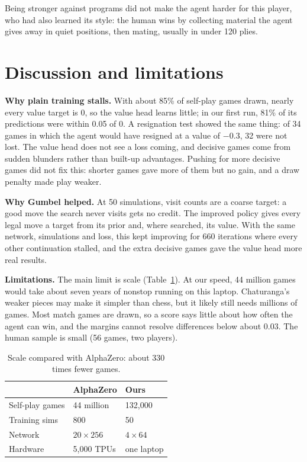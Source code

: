 \documentclass[11pt,a4paper,twocolumn]{article}
\begin{document}
\noindent Being stronger against programs did not make the agent harder for this player,
who had also learned its style: the human wins by collecting material the agent gives away
in quiet positions, then mating, usually in under 120 plies.

\section{Discussion and limitations}
\textbf{Why plain training stalls.} With about 85\% of self-play games drawn, nearly every
value target is 0, so the value head learns little; in our first run, 81\% of its
predictions were within 0.05 of 0. A resignation test showed the same thing: of 34 games
in which the agent would have resigned at a value of $-0.3$, 32 were not lost. The value
head does not see a loss coming, and decisive games come from sudden blunders rather than
built-up advantages. Pushing for more decisive games did not fix this: shorter games
gave more of them but no gain, and a draw penalty made play weaker.

\textbf{Why Gumbel helped.} At 50 simulations, visit counts are a coarse target: a good move
the search never visits gets no credit. The improved policy gives every legal move a
target from its prior and, where searched, its value. With the same network, simulations and
loss, this kept improving for 660 iterations where every other continuation stalled, and
the extra decisive games gave the value head more real results.

\textbf{Limitations.} The main limit is scale (Table~\ref{tab:scale}). At our speed, 44
million games would take about seven years of nonstop running on this laptop. Chaturanga's
weaker pieces may make it simpler than chess, but it likely still needs millions of games.
Most match games are drawn, so a score says little about how often the agent can win, and
the margins cannot resolve differences below about 0.03. The human sample is small (56 games,
two players).

\begin{table}[h]
\centering
\small
\begin{tabular}{@{}lll@{}}
\toprule
 & AlphaZero & Ours \\
\midrule
Self-play games & 44 million & 132,000 \\
Training sims & 800 & 50 \\
Network & $20\times256$ & $4\times64$ \\
Hardware & 5,000 TPUs & one laptop \\
\bottomrule
\end{tabular}
\caption{Scale compared with AlphaZero: about 330 times fewer games.}
\label{tab:scale}
\end{table}
\end{document}
